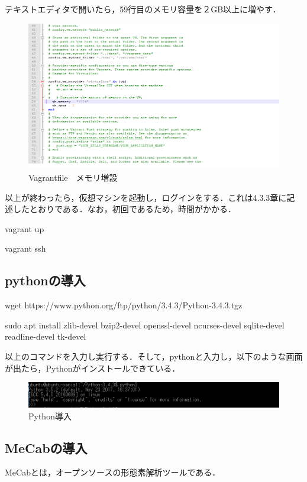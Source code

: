 テキストエディタで開いたら，59行目のメモリ容量を２GB以上に増やす．
\begin{figure}[htb]
\centering
\includegraphics[width=13cm]{4-23.png}
\caption{Vagrantfile　メモリ増設}\label{4-23}
\end{figure}

以上が終わったら，仮想マシンを起動し，ログインをする．これは4.3.3章に記述したとおりである．なお，初回であるため，時間がかかる．

vagrant up

vagrant ssh

\newpage

\subsection{pythonの導入}
wget https://www.python.org/ftp/python/3.4.3/Python-3.4.3.tgz

sudo apt install zlib-devel bzip2-devel openssl-devel ncurses-devel sqlite-devel readline-devel tk-devel

以上のコマンドを入力し実行する．そして，pythonと入力し，以下のような画面が出たら，Pythonがインストールできている．
\begin{figure}[htb]
\centering
\includegraphics[width=13cm]{4-24.png}
\caption{Python導入}\label{4-24}
\end{figure}
\newpage

\subsection{MeCabの導入}
MeCabとは，オープンソースの形態素解析ツールである．

